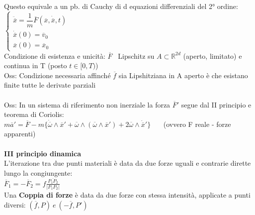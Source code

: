\documentclass{article}
\begin{document}
Questo equivale a un pb. di Cauchy di d equazioni differenziali del 2° ordine: \ \ \ \
$\begin{cases}
\ddot{\overline{x}}=\dfrac{1}{m}\overline{F}( \overline{x},\dot{\overline{x}},t) \\
\dot{\overline{x}}(0) =\overline{v}_{0}\\
\overline{x}(0) =\overline{x}_{0}
\end{cases}$ \\
Condizione di esistenza e unicità: $\overline{F}$ \ Lipschitz su $A\subset\mathbb{R}^{2d}$ (aperto, limitato) e continua in T (posto $t\in[0,T)$)\\
Oss: Condizione necessaria affinché $\overline{f}$ sia Lipshitziana in A aperto è che esistano finite tutte le derivate parziali \\ \\
%
%
%
Oss: In un sistema di riferimento non inerziale la forza $\overline{F}'$ segue dal II principio e teorema di Coriolis: \\
\phantom{} \hspace{0.5in}  $m\overline{a}'=\overline{F} - m\{\dot{\overline{\omega}}\wedge\overline{x}'  +  \overline{\omega}\wedge(\overline{\omega}\wedge\overline{x}')  +  2\overline{\omega}\wedge\dot{\overline{x}}'\}$ \ \ \ (ovvero F reale - forze apparenti) \\ \\
%
%
%
\textbf{III principio dinamica}\\
L'iterazione tra due punti materiali è data da due forze uguali e contrarie dirette lungo la congiungente: \\
\phantom{} \hspace{2in} $\overline{F}_1=-\overline{F}_2=f\frac{\overline{P_1P_2}}{|P_1P_2|}$ \\
Una \textbf{Coppia di forze} è data da due forze con stessa intensità, applicate a punti diversi: $(\overline{f},P) \ e \ (-\overline{f},P')$



\end{document}

